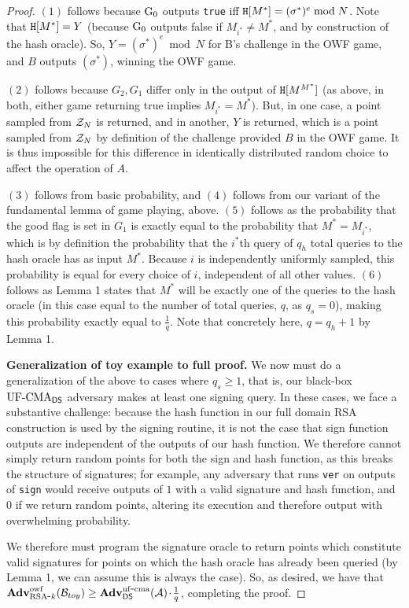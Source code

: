 \begin{proof}
$(1)$ follows because ${{\textnormal G}}_0$ outputs \texttt{true} iff $\mathtt{H}[M^*] = (\sigma^*)^e \bmod N$.  Note that $\mathtt{H}[M^*] = Y$ (because ${{\textnormal G}}_0$ outputs false if $M_{i^*}\neq M^*$, and by construction of the hash oracle).  So, $Y=(\sigma^*)^e \bmod N$ for B's challenge in the OWF game, and $B$ outputs $(\sigma^*)$, winning the OWF game.

$(2)$ follows because $G_2, G_1$ differ only in the output of $\mathtt{H}[M^{M^*}]$ (as above, in both, either game returning true implies $M_{i^*} = M^*$).  But, in one case, a point sampled from $\mathcal{Z}_N$ is returned, and in another, $Y$ is returned, which is a point sampled from $\mathcal{Z}_N$ by definition of the challenge provided $B$ in the OWF game.  It is thus impossible for this difference in identically distributed random choice to affect the operation of $A$.

$(3)$ follows from basic probability, and $(4)$ follows from our variant of the fundamental lemma of game playing, above.  $(5)$ follows as the probability that the good flag is set in $G_1$ is exactly equal to the probability that $M^* = M_{i^*}$, which is by definition the probability that the $i^*$th query of $q_h$ total queries to the hash oracle has as input $M^*$.  Because $i$ is independently uniformly sampled, this probability is equal for every choice of $i$, independent of all other values. $(6)$ follows as Lemma 1 states that $M^*$ will be exactly one of the queries to the hash oracle (in this case equal to the number of total queries, $q$, as $q_s=0$), making this probability exactly equal to $\frac{1}{q}$.  Note that concretely here, $q=q_h+1$ by Lemma 1.

\textbf{Generalization of toy example to full proof.}  We now must do a generalization of the above to cases where $q_s \geq 1$, that is, our black-box $\textnormal{UF-CMA}_{\mathsf{DS}}$ adversary makes at least one signing query.  In these cases, we face a substantive challenge: because the hash function in our full domain RSA construction is used by the signing routine, it is not the case that sign function outputs are independent of the outputs of our hash function.  We therefore cannot simply return random points for both the sign and hash function, as this breaks the structure of signatures; for example, any adversary that runs \texttt{ver} on outputs of \texttt{sign} would receive outputs of $1$ with a valid signature and hash function, and $0$ if we return random points, altering its execution and therefore output with overwhelming probability.

We therefore must program the signature oracle to return points which constitute valid signatures for points on which the hash oracle has already been queried (by Lemma 1, we can assume this is always the case).  So, as desired, we have that $\mathbf{Adv}^{\mathrm{owf}}_{{\textnormal{RSA}\mbox{-} k}}({\mathcal B}_{toy}) \ge \mathbf{Adv}^{\mathrm{uf\mbox{-} cma}}_{{\mathsf{DS}}}({\mathcal A}){\hspace{-0.1ex}}{\hspace{-0.1ex}}{\hspace{-0.1ex}}\cdot{\hspace{-0.1ex}}{\hspace{-0.1ex}}{\hspace{-0.1ex}}\frac{1}{q}$, completing the proof.




\end{proof}
